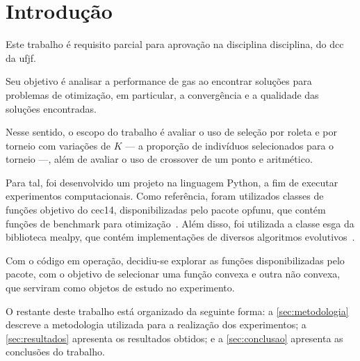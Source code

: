 \section{Introdução}%
\label{sec:introducao}

Este trabalho é requisito parcial para aprovação na disciplina \gls{disciplina}, do \gls{dcc} da \gls{ufjf}.

Seu objetivo é analisar a performance de \glspl{ga} ao encontrar soluções para problemas de otimização, em particular, a convergência e a qualidade das soluções encontradas.

Nesse sentido, o escopo do trabalho é avaliar
o uso de seleção por roleta e por torneio com variações de \(K\) --- a proporção de indivíduos selecionados para o torneio ---, além de avaliar o uso de \gls{crossover} de um ponto e aritmético.

Para tal, foi desenvolvido um projeto na linguagem Python, a fim de executar experimentos computacionais.
Como referência, foram utilizados classes de funções objetivo do \gls{cec14}, disponibilizadas pelo pacote \gls{opfunu}, que contém funções de benchmark para otimização~\cite{opfunu_paper}.
Além disso, foi utilizada a classe \gls{esga} da biblioteca \gls{mealpy}, que contém implementações de diversos algoritmos evolutivos~\cite{mealpy_paper}.

Com o código em operação, decidiu-se explorar as funções disponibilizadas pelo pacote, com o objetivo de selecionar uma função convexa e outra não convexa, que serviram como objetos de estudo no experimento.

O restante deste trabalho está organizado da seguinte forma: a \autoref{sec:metodologia} descreve a metodologia utilizada para a realização dos experimentos; a \autoref{sec:resultados} apresenta os resultados obtidos; e a \autoref{sec:conclusao} apresenta as conclusões do trabalho.
